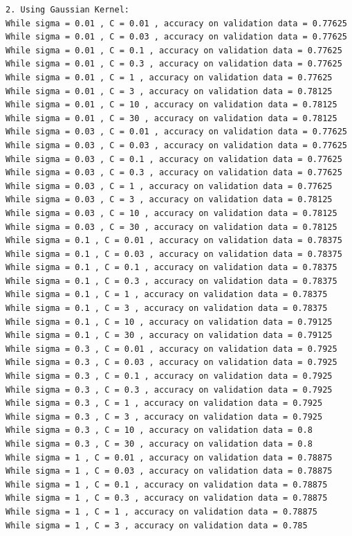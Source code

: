 \documentclass[paper=a4, fontsize=11pt]{scrartcl} %
\numberwithin{equation}{section} %
\numberwithin{figure}{section} %
\numberwithin{table}{section} %
\begin{document}
\begin{verbatim}
2. Using Gaussian Kernel:
While sigma = 0.01 , C = 0.01 , accuracy on validation data = 0.77625
While sigma = 0.01 , C = 0.03 , accuracy on validation data = 0.77625
While sigma = 0.01 , C = 0.1 , accuracy on validation data = 0.77625
While sigma = 0.01 , C = 0.3 , accuracy on validation data = 0.77625
While sigma = 0.01 , C = 1 , accuracy on validation data = 0.77625
While sigma = 0.01 , C = 3 , accuracy on validation data = 0.78125
While sigma = 0.01 , C = 10 , accuracy on validation data = 0.78125
While sigma = 0.01 , C = 30 , accuracy on validation data = 0.78125
While sigma = 0.03 , C = 0.01 , accuracy on validation data = 0.77625
While sigma = 0.03 , C = 0.03 , accuracy on validation data = 0.77625
While sigma = 0.03 , C = 0.1 , accuracy on validation data = 0.77625
While sigma = 0.03 , C = 0.3 , accuracy on validation data = 0.77625
While sigma = 0.03 , C = 1 , accuracy on validation data = 0.77625
While sigma = 0.03 , C = 3 , accuracy on validation data = 0.78125
While sigma = 0.03 , C = 10 , accuracy on validation data = 0.78125
While sigma = 0.03 , C = 30 , accuracy on validation data = 0.78125
While sigma = 0.1 , C = 0.01 , accuracy on validation data = 0.78375
While sigma = 0.1 , C = 0.03 , accuracy on validation data = 0.78375
While sigma = 0.1 , C = 0.1 , accuracy on validation data = 0.78375
While sigma = 0.1 , C = 0.3 , accuracy on validation data = 0.78375
While sigma = 0.1 , C = 1 , accuracy on validation data = 0.78375
While sigma = 0.1 , C = 3 , accuracy on validation data = 0.78375
While sigma = 0.1 , C = 10 , accuracy on validation data = 0.79125
While sigma = 0.1 , C = 30 , accuracy on validation data = 0.79125
While sigma = 0.3 , C = 0.01 , accuracy on validation data = 0.7925
While sigma = 0.3 , C = 0.03 , accuracy on validation data = 0.7925
While sigma = 0.3 , C = 0.1 , accuracy on validation data = 0.7925
While sigma = 0.3 , C = 0.3 , accuracy on validation data = 0.7925
While sigma = 0.3 , C = 1 , accuracy on validation data = 0.7925
While sigma = 0.3 , C = 3 , accuracy on validation data = 0.7925
While sigma = 0.3 , C = 10 , accuracy on validation data = 0.8
While sigma = 0.3 , C = 30 , accuracy on validation data = 0.8
While sigma = 1 , C = 0.01 , accuracy on validation data = 0.78875
While sigma = 1 , C = 0.03 , accuracy on validation data = 0.78875
While sigma = 1 , C = 0.1 , accuracy on validation data = 0.78875
While sigma = 1 , C = 0.3 , accuracy on validation data = 0.78875
While sigma = 1 , C = 1 , accuracy on validation data = 0.78875
While sigma = 1 , C = 3 , accuracy on validation data = 0.785

\end{verbatim}
\end{document}

